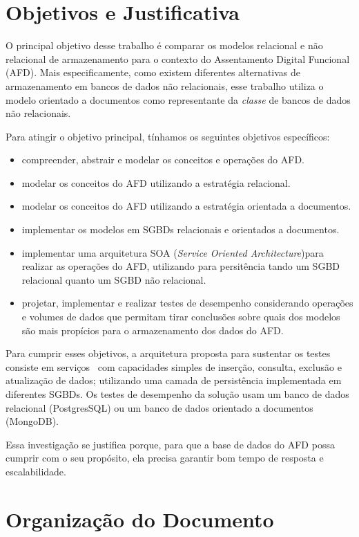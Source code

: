 \section{Objetivos e Justificativa}

O principal objetivo desse trabalho é comparar os modelos relacional e não relacional de armazenamento para o contexto do Assentamento Digital Funcional (AFD). Mais especificamente, como existem diferentes alternativas de armazenamento em bancos de dados não relacionais, esse trabalho utiliza o modelo orientado a documentos como representante da \emph{classe} de bancos de dados não relacionais. 

Para atingir o objetivo principal, tínhamos os seguintes objetivos específicos:

\begin{itemize}
\item compreender, abstrair e modelar os conceitos e operações do AFD.
\item modelar os conceitos do AFD utilizando a estratégia relacional.
\item modelar os conceitos do AFD utilizando a estratégia orientada a documentos.
\item implementar os modelos em SGBDs relacionais e orientados a documentos.
\item implementar uma arquitetura SOA (\emph{Service Oriented Architecture})para realizar as operações do AFD, utilizando para persitência tando um SGBD relacional quanto um SGBD não relacional.
\item projetar, implementar e realizar testes de desempenho considerando operações e volumes de dados que permitam tirar conclusões sobre quais dos modelos são mais propícios para o armazenamento dos dados do AFD. 
\end{itemize}

Para cumprir esses objetivos,  a arquitetura proposta para sustentar os testes consiste em serviços~\cite{erl:2007} com capacidades simples de inserção, consulta, exclusão e atualização de dados; utilizando uma camada de persistência implementada em diferentes SGBDs. Os testes de desempenho da solução usam um banco de dados relacional (PostgresSQL) ou um banco de dados orientado a documentos (MongoDB). 

Essa investigação se justifica porque, para que a base de dados do AFD possa cumprir com o seu propósito, ela precisa garantir bom tempo de resposta e escalabilidade. 


\section{Organização do Documento}

